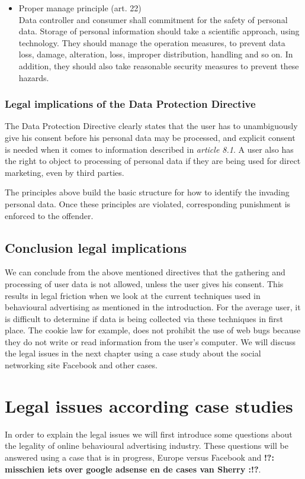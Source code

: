 \documentclass[11pt]{article}
\newcommand{\tocheck}[1]{{\bf !?: #1 :!?}}
\newcommand{\oba}{online behavioural advertising }
\newcommand{\DPD}{Data Protection Directive }
\begin{document}
\begin{itemize}
	\item Proper manage principle (art. 22)\\
Data controller and consumer shall commitment for the safety of personal data. Storage of personal information should take a scientific approach, using technology. They should manage the operation measures, to prevent data loss, damage, alteration, loss, improper distribution, handling and so on. In addition, they should also take reasonable security measures to prevent these hazards.
		

\end{itemize}

\subsubsection{Legal implications of the \DPD}
The \DPD clearly states that the user has to unambiguously give his consent before his personal data may be processed, and explicit consent is needed when it comes to information described in \textit{article 8.1}. A user also has the right to object to processing of personal data if they are being used for direct marketing, even by third parties.

The principles above build the basic structure for how to identify the invading personal data. Once these principles are violated, corresponding punishment is enforced to the offender.

\subsection{Conclusion legal implications}

We can conclude from the above mentioned directives that the gathering and processing of user data is not allowed, unless the user gives his consent. This results in legal friction when we look at the current techniques used in behavioural advertising as mentioned in the introduction. For the average user, it is difficult to determine if data is being collected via these techniques in first place. The cookie law \cite{cookielaw} for example, does not prohibit the use of web bugs because they do not write or read information from the user's computer. We will discuss the legal issues in the next chapter using a case study about the social networking site Facebook and other cases.






\section{Legal issues according case studies}
In order to explain the legal issues we will first introduce some questions about the legality of \oba industry. These questions will be answered using a case that is in progress, Europe versus Facebook and \tocheck{misschien iets over google adsense en de cases van Sherry}.
\end{document}
